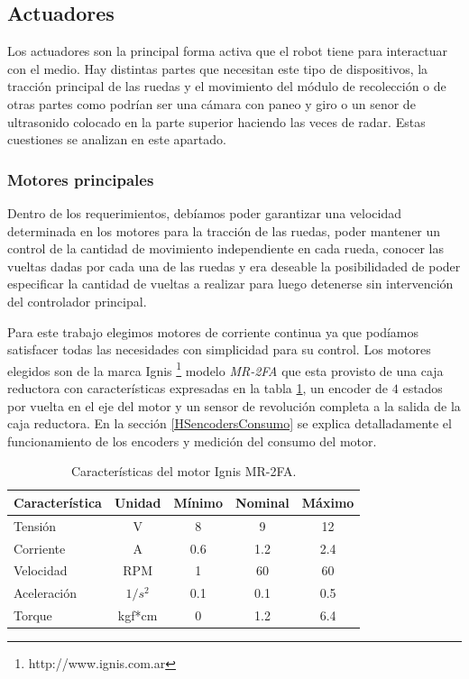 \subsection{Actuadores}
\label{Hactuadores}

Los actuadores son la principal forma activa que el robot tiene para interactuar con el medio. Hay distintas partes que necesitan este tipo de
dispositivos, la tracci\'on principal de las ruedas y el movimiento del m\'odulo de recolecci\'on o de otras partes como podr\'ian ser una
c\'amara con paneo y giro o un senor de ultrasonido colocado en la parte superior haciendo las veces de radar.
Estas cuestiones se analizan en este apartado.

\subsubsection{Motores principales}
\label{HmotoresP}

Dentro de los requerimientos, deb\'iamos poder garantizar una velocidad determinada en los motores para la tracci\'on de las ruedas, poder mantener
un control de la cantidad de movimiento independiente en cada rueda, conocer las vueltas dadas por cada una de las ruedas y era deseable
la posibilidaded de poder especificar la cantidad de vueltas a realizar para luego detenerse sin intervenci\'on del controlador principal.

Para este trabajo elegimos motores de corriente continua ya que pod\'iamos satisfacer todas las necesidades con simplicidad para su control. Los motores
elegidos son de la marca Ignis \footnote{http://www.ignis.com.ar} modelo \emph{MR-2FA} que esta provisto de una caja reductora con caracter\'isticas
expresadas en la tabla \ref{HTmotorDC}, un encoder de $4$ estados por vuelta en el eje del motor y un sensor de revoluci\'on completa a la salida de
la caja reductora. En la secci\'on \ref{HSencodersConsumo} se explica detalladamente el funcionamiento de los encoders y medici\'on del consumo del motor.

\begin{table}
	\begin{center}
		\begin{tabular}{|l|c|c|c|c|}
			\hline
			Caracter\'istica & Unidad & M\'inimo & Nominal & M\'aximo \\
			\hline
			Tensi\'on & V & 8 & 9 & 12 \\
			Corriente & A & 0.6 & 1.2 & 2.4 \\
			Velocidad & RPM & 1 & 60 & 60 \\
			Aceleraci\'on & $1/s^{2}$ & 0.1 & 0.1 & 0.5 \\
			Torque & kgf*cm & 0 & 1.2 & 6.4 \\
			\hline
		\end{tabular}
	\end{center}
	\caption{Caracter\'isticas del motor Ignis MR-2FA.}
	\label{HTmotorDC}
\end{table}

